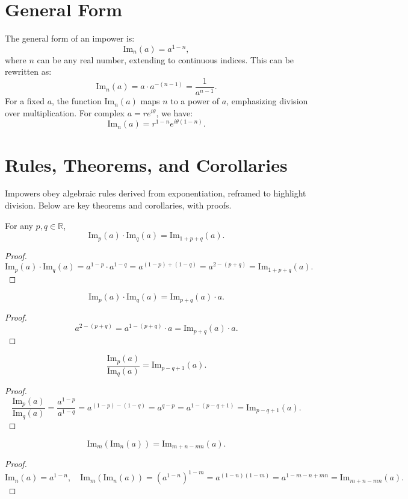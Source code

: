 \documentclass{article}
\begin{document}
\section{General Form}
The general form of an impower is:
\[
\text{Im}_n(a) = a^{1-n},
\]
where \(n\) can be any real number, extending to continuous indices. This can be rewritten as:
\[
\text{Im}_n(a) = a \cdot a^{-(n-1)} = \frac{1}{a^{n-1}}.
\]
For a fixed \(a\), the function \(\text{Im}_n(a)\) maps \(n\) to a power of \(a\), emphasizing division over multiplication. For complex \(a = re^{i\theta}\), we have:
\[
\text{Im}_n(a) = r^{1-n} e^{i\theta (1-n)}.
\]

\section{Rules, Theorems, and Corollaries}
Impowers obey algebraic rules derived from exponentiation, reframed to highlight division. Below are key theorems and corollaries, with proofs.

\begin{theorem}
For any \(p, q \in \mathbb{R}\),
\[
\text{Im}_p(a) \cdot \text{Im}_q(a) = \text{Im}_{1+p+q}(a).
\]
\end{theorem}
\begin{proof}
\[
\text{Im}_p(a) \cdot \text{Im}_q(a) = a^{1-p} \cdot a^{1-q} = a^{(1-p) + (1-q)} = a^{2-(p+q)} = \text{Im}_{1+p+q}(a).
\]
\end{proof}
\begin{corollary}
\[
\text{Im}_p(a) \cdot \text{Im}_q(a) = \text{Im}_{p+q}(a) \cdot a.
\]
\end{corollary}
\begin{proof}
\[
a^{2-(p+q)} = a^{1-(p+q)} \cdot a = \text{Im}_{p+q}(a) \cdot a.
\]
\end{proof}

\begin{theorem}
\[
\frac{\text{Im}_p(a)}{\text{Im}_q(a)} = \text{Im}_{p-q+1}(a).
\]
\end{theorem}
\begin{proof}
\[
\frac{\text{Im}_p(a)}{\text{Im}_q(a)} = \frac{a^{1-p}}{a^{1-q}} = a^{(1-p) - (1-q)} = a^{q-p} = a^{1-(p-q+1)} = \text{Im}_{p-q+1}(a).
\]
\end{proof}

\begin{theorem}
\[
\text{Im}_m(\text{Im}_n(a)) = \text{Im}_{m+n-mn}(a).
\]
\end{theorem}
\begin{proof}
\[
\text{Im}_n(a) = a^{1-n}, \quad \text{Im}_m(\text{Im}_n(a)) = (a^{1-n})^{1-m} = a^{(1-n)(1-m)} = a^{1-m-n+mn} = \text{Im}_{m+n-mn}(a).
\]
\end{proof}
\end{document}
